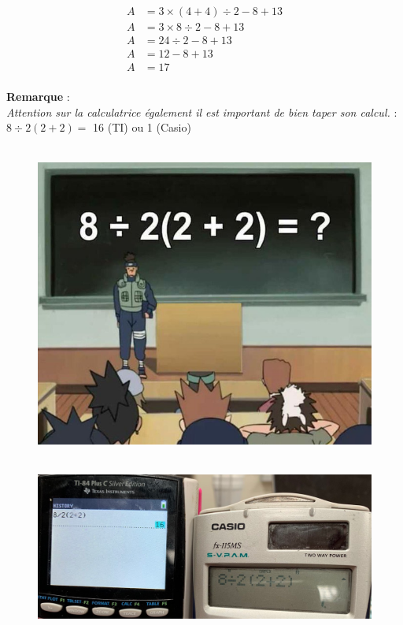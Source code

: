 \documentclass[11pt]{article}
\begin{document}
\begin{align*}
  A &= 3 \times (4 + 4) \div 2 - 8 + 13 \\
  A &= 3 \times 8 \div 2 - 8 + 13\\
  A &= 24 \div 2 - 8 + 13 \\
  A &= 12 - 8  + 13\\
  A &= 17 \\
\end{align*}


\textbf{Remarque} : \\
\textit{Attention sur la calculatrice également il est important de bien taper son calcul. } : $8 \div 2(2+2) =$ 16 (TI) ou 1 (Casio)

\begin{minipage}[t]{0.5\textwidth}
  \begin{figure}[H]
        \centering
        \includegraphics[width=0.7\linewidth]{5x1-calculer/naruto.png}
  \end{figure}
\end{minipage}
\begin{minipage}[t]{0.5\textwidth}
  \begin{figure}[H]
        \centering
        \includegraphics[width=\linewidth]{5x1-calculer/calc.png}
  \end{figure}
\end{minipage}
\end{document}
